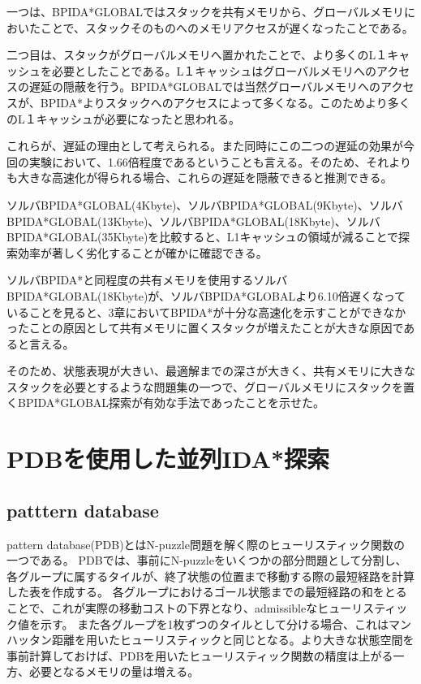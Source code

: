 \documentclass[a4paper,11pt,oneside,openany]{jsbook}
\begin{document}
一つは、BPIDA*GLOBALではスタックを共有メモリから、グローバルメモリにおいたことで、スタックそのものへのメモリアクセスが遅くなったことである。

二つ目は、スタックがグローバルメモリへ置かれたことで、より多くのL１キャッシュを必要としたことである。L１キャッシュはグローバルメモリへのアクセスの遅延の隠蔽を行う。BPIDA*GLOBALでは当然グローバルメモリへのアクセスが、BPIDA*よりスタックへのアクセスによって多くなる。このためより多くのL１キャッシュが必要になったと思われる。

これらが、遅延の理由として考えられる。また同時にこの二つの遅延の効果が今回の実験において、1.66倍程度であるということも言える。そのため、それよりも大きな高速化が得られる場合、これらの遅延を隠蔽できると推測できる。

ソルバBPIDA*GLOBAL(4Kbyte)、ソルバBPIDA*GLOBAL(9Kbyte)、ソルバBPIDA*GLOBAL(13Kbyte)、ソルバBPIDA*GLOBAL(18Kbyte)、ソルバBPIDA*GLOBAL(35Kbyte)を比較すると、L1キャッシュの領域が減ることで探索効率が著しく劣化することが確かに確認できる。

ソルバBPIDA*と同程度の共有メモリを使用するソルバBPIDA*GLOBAL(18Kbyte)が、ソルバBPIDA*GLOBALより6.10倍遅くなっていることを見ると、3章においてBPIDA*が十分な高速化を示すことができなかったことの原因として共有メモリに置くスタックが増えたことが大きな原因であると言える。

そのため、状態表現が大きい、最適解までの深さが大きく、共有メモリに大きなスタックを必要とするような問題集の一つで、グローバルメモリにスタックを置くBPIDA*GLOBAL探索が有効な手法であったことを示せた。





\chapter{PDBを使用した並列IDA*探索}
\section{patttern database}
pattern database(PDB)\cite{CS98}とはN-puzzle問題を解く際のヒューリスティック関数の一つである。
PDBでは、事前にN-puzzleをいくつかの部分問題として分割し、各グループに属するタイルが、終了状態の位置まで移動する際の最短経路を計算した表を作成する。
各グループにおけるゴール状態までの最短経路の和をとることで、これが実際の移動コストの下界となり、admissibleなヒューリスティック値を示す。
また各グループを1枚ずつのタイルとして分ける場合、これはマンハッタン距離を用いたヒューリスティックと同じとなる。より大きな状態空間を事前計算しておけば、PDBを用いたヒューリスティック関数の精度は上がる一方、必要となるメモリの量は増える。
\end{document}
